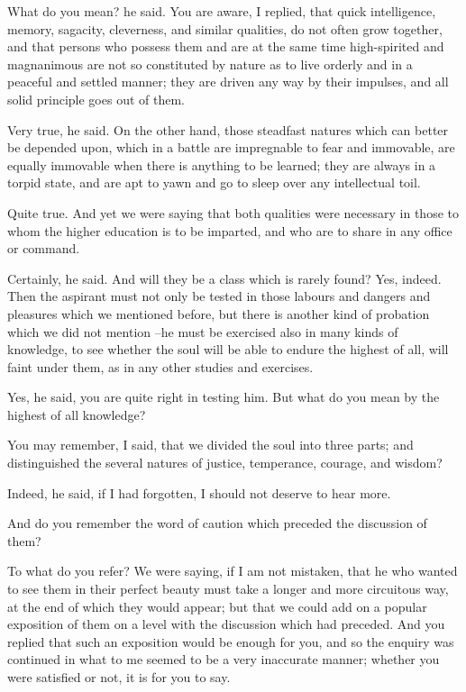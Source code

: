 What do you mean? he said.
You are aware, I replied, that quick intelligence, memory, sagacity, cleverness, and similar qualities, do not often grow together, and that persons who possess them and are at the same time high-spirited and magnanimous are not so constituted by nature as to live orderly and in a peaceful and settled manner; they are driven any way by their impulses, and all solid principle goes out of them.

Very true, he said.
On the other hand, those steadfast natures which can better be depended upon, which in a battle are impregnable to fear and immovable, are equally immovable when there is anything to be learned; they are always in a torpid state, and are apt to yawn and go to sleep over any intellectual toil.

Quite true.
And yet we were saying that both qualities were necessary in those to whom the higher education is to be imparted, and who are to share in any office or command.

Certainly, he said.
And will they be a class which is rarely found?
Yes, indeed.
Then the aspirant must not only be tested in those labours and dangers and pleasures which we mentioned before, but there is another kind of probation which we did not mention --he must be exercised also in many kinds of knowledge, to see whether the soul will be able to endure the highest of all, will faint under them, as in any other studies and exercises.

Yes, he said, you are quite right in testing him. But what do you mean by the highest of all knowledge?

You may remember, I said, that we divided the soul into three parts; and distinguished the several natures of justice, temperance, courage, and wisdom?

Indeed, he said, if I had forgotten, I should not deserve to hear more.

And do you remember the word of caution which preceded the discussion of them?

To what do you refer?
We were saying, if I am not mistaken, that he who wanted to see them in their perfect beauty must take a longer and more circuitous way, at the end of which they would appear; but that we could add on a popular exposition of them on a level with the discussion which had preceded. And you replied that such an exposition would be enough for you, and so the enquiry was continued in what to me seemed to be a very inaccurate manner; whether you were satisfied or not, it is for you to say.

